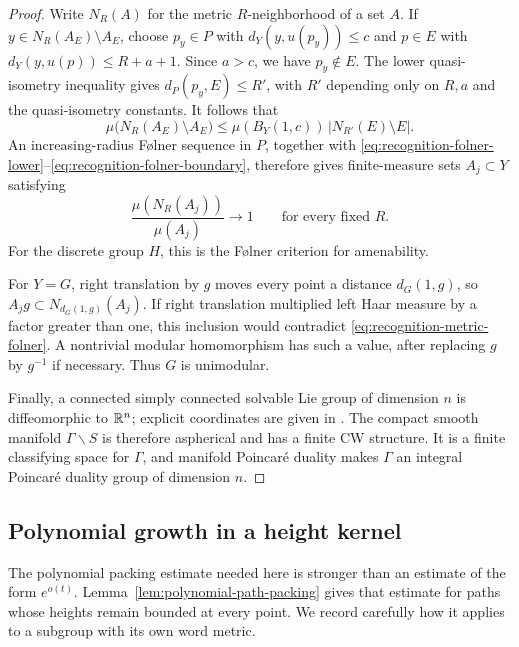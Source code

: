 \begin{proof}
Write $N_R(A)$ for the metric $R$-neighborhood of a set $A$.  If
$y\in N_R(A_E)\setminus A_E$, choose $p_y\in P$ with
$d_Y(y,u(p_y))\leq c$ and $p\in E$ with
$d_Y(y,u(p))\leq R+a+1$.  Since $a>c$, we have $p_y\notin E$.
The lower quasi-isometry inequality gives
$d_P(p_y,E)\leq R'$, with $R'$ depending only on $R,a$ and the
quasi-isometry constants.  It follows that
\begin{equation}\label{eq:recognition-folner-boundary}
 \mu\bigl(N_R(A_E)\setminus A_E\bigr)
 \leq \mu(B_Y(1,c))\,|N_{R'}(E)\setminus E|.
\end{equation}
An increasing-radius F\o lner sequence in $P$, together with
\eqref{eq:recognition-folner-lower}--\eqref{eq:recognition-folner-boundary},
therefore gives finite-measure sets $A_j\subset Y$ satisfying
\begin{equation}\label{eq:recognition-metric-folner}
 \frac{\mu(N_R(A_j))}{\mu(A_j)}\longrightarrow1
 \qquad\text{for every fixed }R.
\end{equation}
For the discrete group $H$, this is the F\o lner criterion for
amenability.

For $Y=G$, right translation by $g$ moves every point a distance
$d_G(1,g)$, so $A_jg\subset N_{d_G(1,g)}(A_j)$.  If right translation
multiplied left Haar measure by a factor greater than one, this inclusion
would contradict \eqref{eq:recognition-metric-folner}.  A nontrivial
modular homomorphism has such a value, after replacing $g$ by $g^{-1}$
if necessary.  Thus $G$ is unimodular.

Finally, a connected simply connected solvable Lie group of dimension
$n$ is diffeomorphic to $\mathbb R^n$; explicit coordinates are given in
\cite[Lemma~3.B.2]{CornulierTessera2017}.
The compact smooth manifold $\Gamma\backslash S$ is therefore
aspherical and has a finite CW structure.  It is a finite classifying
space for $\Gamma$, and manifold Poincar\'e duality makes $\Gamma$ an
integral Poincar\'e duality group of dimension $n$.
\end{proof}

\subsection{Polynomial growth in a height kernel}

The polynomial packing estimate needed here is stronger than an estimate
of the form $e^{o(t)}$.  Lemma~\ref{lem:polynomial-path-packing} gives
that estimate for paths whose heights remain bounded at every point.
We record carefully how it applies to a subgroup with its own word
metric.


